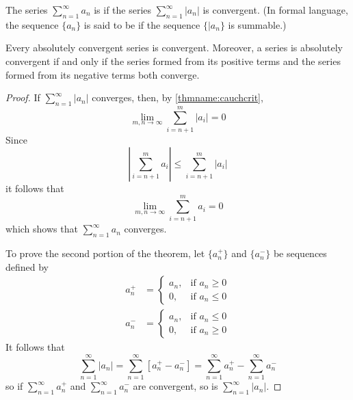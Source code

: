 \documentclass[12pt, a4paper, oneside, openright, titlepage]{book}
\begin{document}
\begin{defn}
    The series $\sum\limits_{n=1}^{\infty}a_n$ is  if the series $\sum\limits_{n=1}^{\infty}|a_n|$ is convergent. (In formal language, the sequence $\{a_n\}$ is said to be  if the sequence $\{|a_n\}$ is summable.)
\end{defn}

\begin{thm}\label{thm:absconv}
    Every absolutely convergent series is convergent. Moreover, a series is absolutely convergent if and only if the series formed from its positive terms and the series formed from its negative terms both converge.
\end{thm}
\begin{proof}
    If $\sum\limits_{n=1}^{\infty}|a_n|$ converges, then, by \ref{thmname:cauchcrit}, \begin{equation*}
        \lim\limits_{m,n\rightarrow \infty}\sum\limits_{i=n+1}^m|a_i| = 0
    \end{equation*}
    Since \begin{equation*}
        \left|\sum\limits_{i=n+1}^ma_i\right| \leq \sum\limits_{i=n+1}^m|a_i|
    \end{equation*}
    it follows that  \begin{equation*}
        \lim\limits_{m,n\rightarrow \infty}\sum\limits_{i=n+1}^ma_i = 0
    \end{equation*}
    which shows that $\sum\limits_{n=1}^{\infty}a_n$ converges.

    To prove the second portion of the theorem, let $\{a_n^+\}$ and $\{a_n^-\}$ be sequences defined by \begin{align*}
        a_n^+ &= \left\{\begin{array}{lc} a_n, & \text{if } a_n\geq 0 \\ 0, & \text{if } a_n \leq 0 \end{array}\right. \\
            a_n^- &= \left\{\begin{array}{lc} a_n, & \text{if } a_n\leq 0 \\ 0, & \text{if } a_n \geq 0 \end{array}\right.
    \end{align*}
    It follows that \begin{equation*}
        \sum\limits_{n=1}^{\infty}|a_n| = \sum\limits_{n=1}^{\infty}[a_n^+-a_n^-] = \sum\limits_{n=1}^{\infty}a_n^+ - \sum\limits_{n=1}^{\infty}a_n^-
    \end{equation*}
    so if $\sum\limits_{n=1}^{\infty}a_n^+$ and $\sum\limits_{n=1}^{\infty}a_n^-$ are convergent, so is $\sum\limits_{n=1}^{\infty}|a_n|$.



\end{proof}
\end{document}
